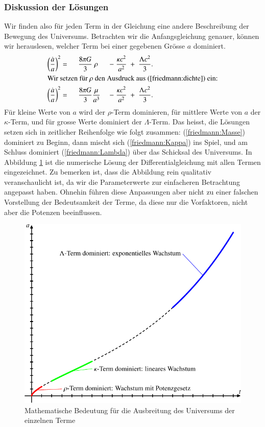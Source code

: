 \begin{refsection}
\subsubsection{Diskussion der Lösungen}
Wir finden also für jeden Term in der Gleichung eine andere Beschreibung der Bewegung des Universums. Betrachten wir die Anfangsgleichung genauer, können wir herauslesen, welcher Term bei einer gegebenen Grösse $a$ dominiert.
\begin{alignat}{5}
	\left(\frac{\dot{a}}{a}\right) ^2 &= \;\; &\frac{8 \pi G}{3}&\;\rho\; &-\;\frac{\kappa c^2}{a^2}\; &+ \;\frac{\Lambda c^2}{3}.\\
	\intertext{Wir setzen für $\rho$ den Ausdruck aus (\ref{friedmann:dichte}) ein:}
	\left(\frac{\dot{a}}{a}\right) ^2 &= \;\;&\frac{8 \pi G}{3} &\frac{\mu}{a^3}\; &-\;\frac{\kappa c^2}{a^2}\; &+\; \frac{\Lambda c^2}{3}.
\end{alignat}
Für kleine Werte von $a$ wird der $\rho$-Term dominieren, für mittlere Werte von $a$ der $\kappa$-Term, und für grosse Werte dominiert der $\Lambda$-Term. Das heisst, die Lösungen setzen sich in zeitlicher Reihenfolge wie folgt zusammen: (\ref{friedmann:Masse})  dominiert zu Beginn, dann mischt sich (\ref{friedmann:Kappa}) ins Spiel, und am Schluss dominiert (\ref{friedmann:Lambda}) über das Schicksal des Universums. In Abbildung \ref{friedmann:mathematischFriedmann} ist die numerische Lösung der Differentialgleichung mit allen Termen eingezeichnet.
Zu bemerken ist, dass die Abbildung rein qualitativ veranschaulicht ist, da wir die Parameterwerte zur einfacheren Betrachtung angepasst haben. Ohnehin führen diese Anpassungen aber nicht zu einer falschen Vorstellung der Bedeutsamkeit der Terme, da diese nur die Vorfaktoren, nicht aber die Potenzen beeinflussen. 
\begin{figure}[h]
	\centering
	\includegraphics{friedmann/images/friedmann-2.pdf}
	\caption{Mathematische Bedeutung für die Ausbreitung des Universums der einzelnen Terme}
	\label{friedmann:mathematischFriedmann}
\end{figure}%

\end{refsection}
